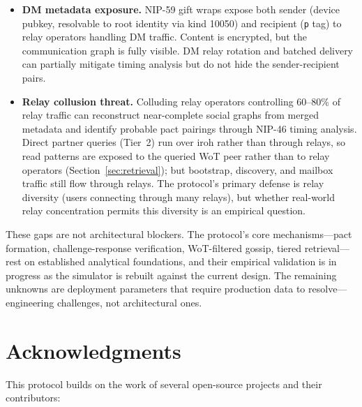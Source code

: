 \documentclass[11pt,a4paper]{article}
\begin{document}
\begin{itemize}
  \item \textbf{DM metadata exposure.} NIP-59 gift wraps expose both sender (device pubkey, resolvable to root identity via kind 10050) and recipient (\texttt{p} tag) to relay operators handling DM traffic. Content is encrypted, but the communication graph is fully visible. DM relay rotation and batched delivery can partially mitigate timing analysis but do not hide the sender-recipient pairs.

  \item \textbf{Relay collusion threat.} Colluding relay operators controlling 60--80\% of relay traffic can reconstruct near-complete social graphs from merged metadata and identify probable pact pairings through NIP-46 timing analysis. Direct partner queries (Tier~2) run over iroh rather than through relays, so read patterns are exposed to the queried WoT peer rather than to relay operators (Section~\ref{sec:retrieval}); but bootstrap, discovery, and mailbox traffic still flow through relays. The protocol's primary defense is relay diversity (users connecting through many relays), but whether real-world relay concentration permits this diversity is an empirical question.
\end{itemize}

These gaps are not architectural blockers. The protocol's core mechanisms---pact formation, challenge-response verification, WoT-filtered gossip, tiered retrieval---rest on established analytical foundations, and their empirical validation is in progress as the simulator is rebuilt against the current design. The remaining unknowns are deployment parameters that require production data to resolve---engineering challenges, not architectural ones.

\section*{Acknowledgments}

This protocol builds on the work of several open-source projects and their contributors:
\end{document}
